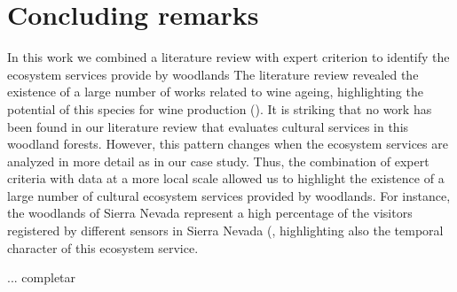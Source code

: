 \section{Concluding remarks}\label{sec:es:concluding} 
In this work we combined a literature review with expert criterion to identify the ecosystem services provide by \Qp woodlands The literature review revealed the existence of a large number of works related to wine ageing, highlighting the potential of this species for wine production (). It is striking that no work has been found in our literature review that evaluates cultural services in this woodland forests. However, this pattern changes when the ecosystem services are analyzed in more detail as in our case study. Thus, the combination of expert criteria with data at a more local scale allowed us to highlight the existence of a large number of cultural ecosystem services provided by \Qp woodlands. For instance, the \Qp woodlands of Sierra Nevada represent a high percentage of the visitors registered by different sensors in Sierra Nevada (, highlighting also the temporal character of this ecosystem service. 

... completar 






